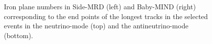\begin{figure}[tbh]
\begin{center}
\begin{subfigure}{0.48\textwidth}
    \end{subfigure}    
    \end{center}
  \caption{
Iron plane numbers in Side-MRD (left) and Baby-MIND (right) corresponding to the end points of the longest tracks in the selected events in the neutrino-mode (top) and the antineutrino-mode (bottom).
}
\label{fig:fig:endpoint_longest_track}
\end{figure}



%




